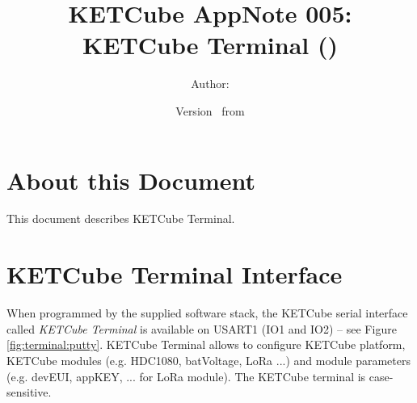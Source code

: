  




\title{\UWBLogo KETCube AppNote 005:\\ KETCube Terminal (\vhCurrentVersion)}

\author{Author: \vhListAllAuthorsLongWithAbbrev}
\date{Version \vhCurrentVersion\ from \vhCurrentDate}

  




  


\section*{About this Document}


This document describes KETCube Terminal. 

\setcounter{tocdepth}{2}
\tableofcontents
\clearpage

\listoffigures
\listoftables
\begin{versionhistory}
\end{versionhistory}
\setcounter{table}{0}

\clearpage 
{} 
\pagestyle{headings} 

\clearpage 
\section{KETCube Terminal Interface}
When programmed by the supplied software stack, the KETCube serial interface called {\it KETCube Terminal} is available on USART1 (IO1 and IO2) -- see Figure \ref{fig:terminal:putty}. KETCube Terminal allows to configure KETCube platform, KETCube modules (e.g. HDC1080, batVoltage, LoRa ...) and module parameters (e.g. devEUI, appKEY, ... for LoRa module). The KETCube terminal is case-sensitive.

